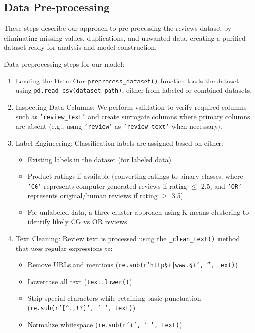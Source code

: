 \subsection{Data Pre-processing}\label{SCM}
These steps describe our approach to pre-processing the reviews dataset by eliminating missing values, duplications, and unwanted data, creating a purified dataset ready for analysis and model construction.

Data preprocessing steps for our model:
\begin{enumerate}
    \item Loading the Data: Our \texttt{preprocess\_dataset()} function loads the dataset using \texttt{pd.read\_csv(dataset\_path)}, either from labeled or combined datasets.

    \item Inspecting Data Columns: We perform validation to verify required columns such as \texttt{'review\_text'} and create surrogate columns where primary columns are absent (e.g., using \texttt{'review'} as \texttt{'review\_text'} when necessary).

    \item Label Engineering: Classification labels are assigned based on either:
    \begin{itemize}
        \item Existing labels in the dataset (for labeled data)
        \item Product ratings if available (converting ratings to binary classes, where \texttt{'CG'} represents computer-generated reviews if rating $\leq$ 2.5, and \texttt{'OR'} represents original/human reviews if rating $\geq$ 3.5)
        \item For unlabeled data, a three-cluster approach using K-means clustering to identify likely CG vs OR reviews
    \end{itemize}

    \item Text Cleaning: Review text is processed using the \texttt{\_clean\_text()} method that uses regular expressions to:
    \begin{itemize}
        \item Remove URLs and mentions (\texttt{re.sub(r'http\S+|www.\S+', '', text)})
        \item Lowercase all text (\texttt{text.lower()})
        \item Strip special characters while retaining basic punctuation (\texttt{re.sub(r'[^\w\s.,!?]', ' ', text)})
        \item Normalize whitespace (\texttt{re.sub(r'\s+', ' ', text)})
    \end{itemize}


\end{enumerate}
